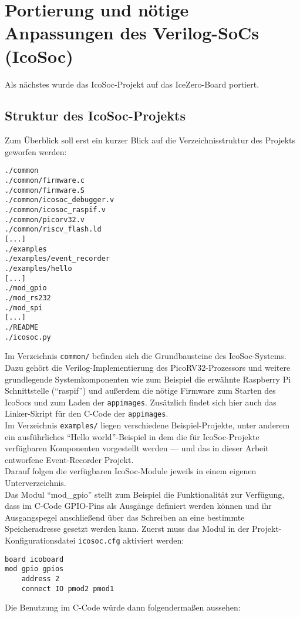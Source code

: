 {\section{Portierung und nötige Anpassungen des Verilog-SoCs (IcoSoc)}
\label{ch:Implementierung:sec:icosoc}
Als nächstes wurde das IcoSoc-Projekt auf das IceZero-Board portiert. 

\subsection{Struktur des IcoSoc-Projekts}
Zum Überblick soll erst ein kurzer Blick auf die Verzeichnisstruktur des Projekts geworfen werden:
\begin{verbatim}
./common
./common/firmware.c
./common/firmware.S
./common/icosoc_debugger.v
./common/icosoc_raspif.v
./common/picorv32.v
./common/riscv_flash.ld
[...]
./examples
./examples/event_recorder
./examples/hello
[...]
./mod_gpio
./mod_rs232
./mod_spi
[...]
./README
./icosoc.py
\end{verbatim}

Im Verzeichnis {\tt common/} befinden sich die Grundbausteine des IcoSoc-Systems. Dazu gehört die Verilog-Implementierung des PicoRV32-Prozessors und weitere grundlegende Systemkomponenten wie zum Beispiel die erwähnte Raspberry Pi Schnittstelle (``raspif'') und außerdem die nötige Firmware zum Starten des IcoSocs und zum Laden der {\tt appimages}. Zusätzlich findet sich hier auch das Linker-Skript für den C-Code der {\tt appimages}.\\
Im Verzeichnis {\tt examples/} liegen verschiedene Beispiel-Projekte, unter anderem ein ausführliches ``Hello world''-Beispiel in dem die für IcoSoc-Projekte verfügbaren Komponenten vorgestellt werden --- und das in dieser Arbeit entworfene Event-Recorder Projekt.\\
Darauf folgen die verfügbaren IcoSoc-Module jeweils in einem eigenen Unterverzeichnis.\\
Das Modul ``mod\_gpio'' stellt zum Beispiel die Funktionalität zur Verfügung, dass im C-Code GPIO-Pins als Ausgänge definiert werden können und ihr Ausgangspegel anschließend über das Schreiben an eine bestimmte Speicheradresse gesetzt werden kann. 
Zuerst muss das Modul in der Projekt-Konfigurationsdatei {\tt icosoc.cfg} aktiviert werden:
\begin{verbatim}
board icoboard
mod gpio gpios
    address 2
    connect IO pmod2 pmod1
\end{verbatim}

Die Benutzung im C-Code würde dann folgendermaßen aussehen:

}
